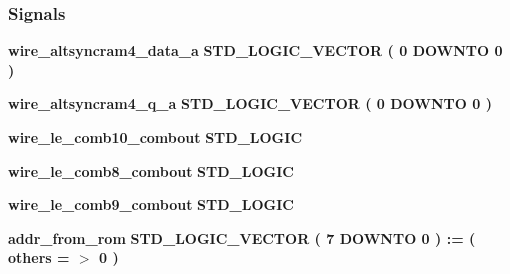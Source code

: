 \subsubsection*{Signals}
 \begin{DoxyCompactItemize}
\item 
{\bf wire\+\_\+altsyncram4\+\_\+data\+\_\+a} {\bfseries \textcolor{comment}{S\+T\+D\+\_\+\+L\+O\+G\+I\+C\+\_\+\+V\+E\+C\+T\+OR}\textcolor{vhdlchar}{ }\textcolor{vhdlchar}{(}\textcolor{vhdlchar}{ }\textcolor{vhdlchar}{ } \textcolor{vhdldigit}{0} \textcolor{vhdlchar}{ }\textcolor{keywordflow}{D\+O\+W\+N\+TO}\textcolor{vhdlchar}{ }\textcolor{vhdlchar}{ } \textcolor{vhdldigit}{0} \textcolor{vhdlchar}{ }\textcolor{vhdlchar}{)}\textcolor{vhdlchar}{ }} 
\item 
{\bf wire\+\_\+altsyncram4\+\_\+q\+\_\+a} {\bfseries \textcolor{comment}{S\+T\+D\+\_\+\+L\+O\+G\+I\+C\+\_\+\+V\+E\+C\+T\+OR}\textcolor{vhdlchar}{ }\textcolor{vhdlchar}{(}\textcolor{vhdlchar}{ }\textcolor{vhdlchar}{ } \textcolor{vhdldigit}{0} \textcolor{vhdlchar}{ }\textcolor{keywordflow}{D\+O\+W\+N\+TO}\textcolor{vhdlchar}{ }\textcolor{vhdlchar}{ } \textcolor{vhdldigit}{0} \textcolor{vhdlchar}{ }\textcolor{vhdlchar}{)}\textcolor{vhdlchar}{ }} 
\item 
{\bf wire\+\_\+le\+\_\+comb10\+\_\+combout} {\bfseries \textcolor{comment}{S\+T\+D\+\_\+\+L\+O\+G\+IC}\textcolor{vhdlchar}{ }} 
\item 
{\bf wire\+\_\+le\+\_\+comb8\+\_\+combout} {\bfseries \textcolor{comment}{S\+T\+D\+\_\+\+L\+O\+G\+IC}\textcolor{vhdlchar}{ }} 
\item 
{\bf wire\+\_\+le\+\_\+comb9\+\_\+combout} {\bfseries \textcolor{comment}{S\+T\+D\+\_\+\+L\+O\+G\+IC}\textcolor{vhdlchar}{ }} 
\item 
{\bf addr\+\_\+from\+\_\+rom} {\bfseries \textcolor{comment}{S\+T\+D\+\_\+\+L\+O\+G\+I\+C\+\_\+\+V\+E\+C\+T\+OR}\textcolor{vhdlchar}{ }\textcolor{vhdlchar}{(}\textcolor{vhdlchar}{ }\textcolor{vhdlchar}{ } \textcolor{vhdldigit}{7} \textcolor{vhdlchar}{ }\textcolor{keywordflow}{D\+O\+W\+N\+TO}\textcolor{vhdlchar}{ }\textcolor{vhdlchar}{ } \textcolor{vhdldigit}{0} \textcolor{vhdlchar}{ }\textcolor{vhdlchar}{)}\textcolor{vhdlchar}{ }\textcolor{vhdlchar}{ }\textcolor{vhdlchar}{ }\textcolor{vhdlchar}{\+:}\textcolor{vhdlchar}{=}\textcolor{vhdlchar}{ }\textcolor{vhdlchar}{(}\textcolor{vhdlchar}{ }\textcolor{vhdlchar}{ }\textcolor{keywordflow}{others}\textcolor{vhdlchar}{ }\textcolor{vhdlchar}{ }\textcolor{vhdlchar}{=}\textcolor{vhdlchar}{ }\textcolor{vhdlchar}{$>$}\textcolor{vhdlchar}{ }\textcolor{vhdlchar}{\textquotesingle{}}\textcolor{vhdlchar}{ } \textcolor{vhdldigit}{0} \textcolor{vhdlchar}{ }\textcolor{vhdlchar}{\textquotesingle{}}\textcolor{vhdlchar}{ }\textcolor{vhdlchar}{)}\textcolor{vhdlchar}{ }} 

\end{DoxyCompactItemize}
